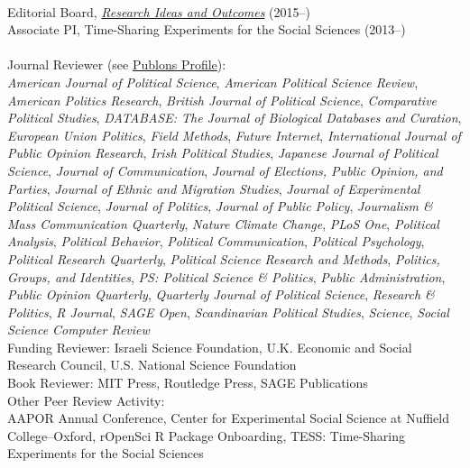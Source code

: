 \documentclass[12pt]{article}
\renewcommand{\section}[1]{\pagebreak[3]%
    \llap{\scshape\smash{\parbox[t]{\marginparwidth}{\raggedright {\color{lg}#1}}}}%
    \vspace{-\baselineskip}\par}
\newcommand{\topic}[1]{\pagebreak[3]\indent {\color{lg}{\footnotesize #1 }}\\}
\newcommand{\entry}[1]{\indent {\color{lg}\guillemotright}\hspace{2pt}#1\vspace{.25em}\\}
\begin{document}
\section{Editing \&\\ Reviewing}
\topic{Editing}
	\entry{Editorial Board, \href{http://riojournal.com/}{\textit{Research Ideas and Outcomes}} (2015--)}
	\entry{Associate PI, Time-Sharing Experiments for the Social Sciences (2013--)}
\topic{Review Activity}
	\entry{Journal Reviewer (see \href{https://publons.com/a/634082/}{Publons Profile}):\\\textit{American Journal of Political Science}, \textit{American Political Science Review}, \textit{American Politics Research}, \textit{British Journal of Political Science}, \textit{Comparative Political Studies}, \textit{DATABASE: The Journal of Biological Databases and Curation}, \textit{European Union Politics}, \textit{Field Methods}, \textit{Future Internet}, \textit{International Journal of Public Opinion Research}, \textit{Irish Political Studies}, \textit{Japanese Journal of Political Science}, \textit{Journal of Communication}, \textit{Journal of Elections, Public Opinion, and Parties}, \textit{Journal of Ethnic and Migration Studies}, \textit{Journal of Experimental Political Science}, \textit{Journal of Politics}, \textit{Journal of Public Policy}, \textit{Journalism \& Mass Communication Quarterly}, \textit{Nature Climate Change}, \textit{PLoS One}, \textit{Political Analysis}, \textit{Political Behavior}, \textit{Political Communication}, \textit{Political Psychology}, \textit{Political Research Quarterly}, \textit{Political Science Research and Methods}, \textit{Politics, Groups, and Identities}, \textit{PS: Political Science \& Politics}, \textit{Public Administration}, \textit{Public Opinion Quarterly}, \textit{Quarterly Journal of Political Science}, \textit{Research \& Politics}, \textit{R Journal}, \textit{SAGE Open}, \textit{Scandinavian Political Studies}, \textit{Science}, \textit{Social Science Computer Review}}
	\entry{Funding Reviewer: Israeli Science Foundation, U.K. Economic and Social Research Council, U.S. National Science Foundation}
	\entry{Book Reviewer: MIT Press, Routledge Press, SAGE Publications}
	\entry{Other Peer Review Activity:\\ AAPOR Annual Conference, Center for Experimental Social Science at Nuffield College--Oxford, rOpenSci R Package Onboarding, TESS: Time-Sharing Experiments for the Social Sciences}
\end{document}
